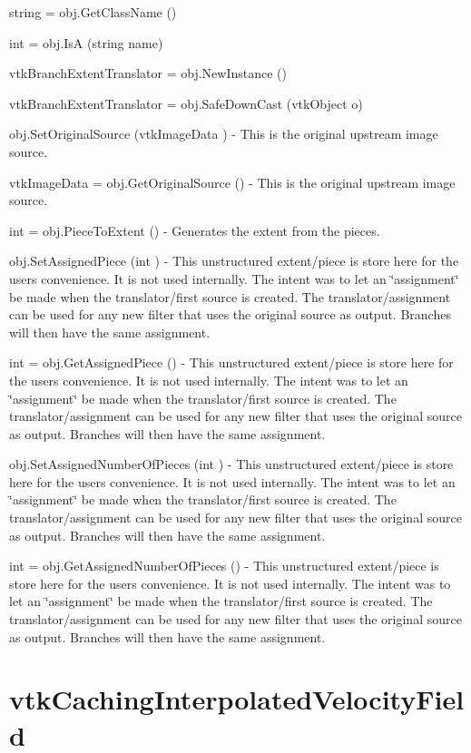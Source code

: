 \begin{DoxyItemize}
\item {\ttfamily string = obj.\-Get\-Class\-Name ()}  
\item {\ttfamily int = obj.\-Is\-A (string name)}  
\item {\ttfamily vtk\-Branch\-Extent\-Translator = obj.\-New\-Instance ()}  
\item {\ttfamily vtk\-Branch\-Extent\-Translator = obj.\-Safe\-Down\-Cast (vtk\-Object o)}  
\item {\ttfamily obj.\-Set\-Original\-Source (vtk\-Image\-Data )} -\/ This is the original upstream image source.  
\item {\ttfamily vtk\-Image\-Data = obj.\-Get\-Original\-Source ()} -\/ This is the original upstream image source.  
\item {\ttfamily int = obj.\-Piece\-To\-Extent ()} -\/ Generates the extent from the pieces.  
\item {\ttfamily obj.\-Set\-Assigned\-Piece (int )} -\/ This unstructured extent/piece is store here for the users convenience. It is not used internally. The intent was to let an \char`\"{}assignment\char`\"{} be made when the translator/first source is created. The translator/assignment can be used for any new filter that uses the original source as output. Branches will then have the same assignment.  
\item {\ttfamily int = obj.\-Get\-Assigned\-Piece ()} -\/ This unstructured extent/piece is store here for the users convenience. It is not used internally. The intent was to let an \char`\"{}assignment\char`\"{} be made when the translator/first source is created. The translator/assignment can be used for any new filter that uses the original source as output. Branches will then have the same assignment.  
\item {\ttfamily obj.\-Set\-Assigned\-Number\-Of\-Pieces (int )} -\/ This unstructured extent/piece is store here for the users convenience. It is not used internally. The intent was to let an \char`\"{}assignment\char`\"{} be made when the translator/first source is created. The translator/assignment can be used for any new filter that uses the original source as output. Branches will then have the same assignment.  
\item {\ttfamily int = obj.\-Get\-Assigned\-Number\-Of\-Pieces ()} -\/ This unstructured extent/piece is store here for the users convenience. It is not used internally. The intent was to let an \char`\"{}assignment\char`\"{} be made when the translator/first source is created. The translator/assignment can be used for any new filter that uses the original source as output. Branches will then have the same assignment.  
\end{DoxyItemize}\hypertarget{vtkparallel_vtkcachinginterpolatedvelocityfield}{}\section{vtk\-Caching\-Interpolated\-Velocity\-Field}\label{vtkparallel_vtkcachinginterpolatedvelocityfield}
